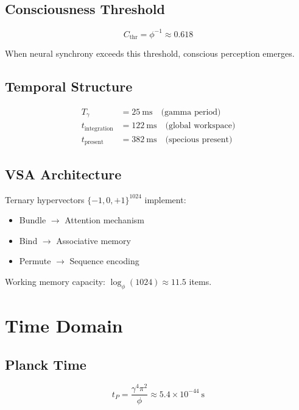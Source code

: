 \documentclass[12pt,a4paper]{article}
\begin{document}
\subsection{Consciousness Threshold}

\begin{equation}
C_{\text{thr}} = \phi^{-1} \approx 0.618
\end{equation}

When neural synchrony exceeds this threshold, conscious perception emerges.

\subsection{Temporal Structure}

\begin{align}
T_\gamma &= 25~\text{ms} \quad \text{(gamma period)} \\
t_{\text{integration}} &= 122~\text{ms} \quad \text{(global workspace)} \\
t_{\text{present}} &= 382~\text{ms} \quad \text{(specious present)}
\end{align}

\subsection{VSA Architecture}

Ternary hypervectors $\{-1, 0, +1\}^{1024}$ implement:
\begin{itemize}
\item Bundle $\rightarrow$ Attention mechanism
\item Bind $\rightarrow$ Associative memory
\item Permute $\rightarrow$ Sequence encoding
\end{itemize}

Working memory capacity: $\log_\phi(1024) \approx 11.5$ items.

\section{Time Domain}

\subsection{Planck Time}

\begin{equation}
t_P = \frac{\gamma^4 \pi^2}{\phi} \approx 5.4 \times 10^{-44}~\text{s}
\end{equation}
\end{document}
